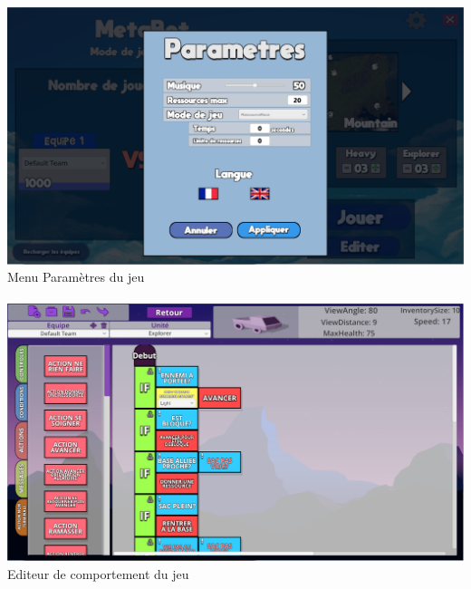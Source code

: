 \documentclass{report}
\begin{document}
\paragraph{}
\begin{adjustwidth}{-3em}{-3em}
\begin{center}
\includegraphics[scale=0.5]{DATA/menuparametre.png}
 {Menu Paramètres du jeu}
\end{center}
\end{adjustwidth}
\paragraph{}

\paragraph{}
\begin{adjustwidth}{-3em}{-3em}
\begin{center}
\includegraphics[scale=0.5]{DATA/editeurcomportement.png}
 {Editeur de comportement du jeu}
\end{center}
\end{adjustwidth}
\end{document}
